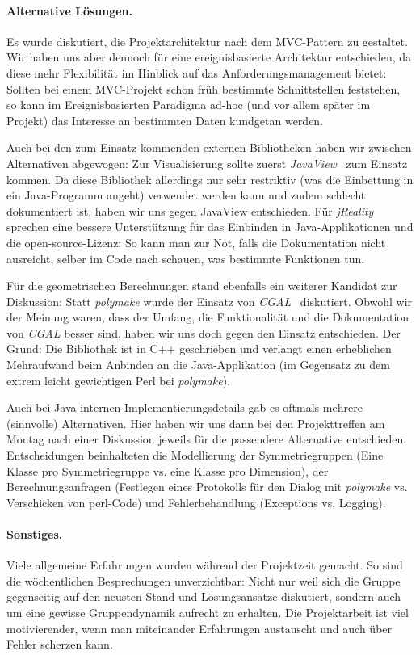 \paragraph{Alternative Lösungen.}
Es wurde diskutiert, die Projektarchitektur nach dem MVC-Pattern zu gestaltet. Wir haben uns aber dennoch für eine ereignisbasierte Architektur
entschieden, da diese mehr Flexibilität im Hinblick auf das Anforderungsmanagement bietet: Sollten bei einem MVC-Projekt schon früh bestimmte
Schnittstellen feststehen, so kann im Ereignisbasierten Paradigma ad-hoc (und vor allem später im Projekt) das Interesse an bestimmten Daten kundgetan werden.

\noindent Auch bei den zum Einsatz kommenden externen Bibliotheken haben wir zwischen Alternativen abgewogen: Zur Visualisierung
sollte zuerst \emph{JavaView}~\cite{javaview} zum Einsatz kommen. Da diese Bibliothek allerdings nur sehr restriktiv (was die Einbettung in ein Java-Programm angeht) verwendet werden kann und zudem schlecht dokumentiert ist, haben wir uns gegen JavaView entschieden.
Für \emph{jReality} sprechen eine bessere Unterstützung für das Einbinden in Java-Applikationen und die open-source-Lizenz: So kann man zur Not,
falls die Dokumentation nicht ausreicht, selber im Code nach schauen, was bestimmte Funktionen tun.

\noindent Für die geometrischen Berechnungen stand ebenfalls ein weiterer Kandidat zur Diskussion: Statt \emph{polymake} wurde der
Einsatz von \emph{CGAL}~\cite{cgal} diskutiert. Obwohl wir der Meinung waren, dass der Umfang, die Funktionalität und die Dokumentation von \emph{CGAL} besser sind, haben wir uns doch gegen den Einsatz entschieden. Der Grund: Die Bibliothek ist in C++ geschrieben und 
verlangt einen erheblichen Mehraufwand beim Anbinden an die Java-Applikation (im Gegensatz zu dem extrem leicht gewichtigen Perl bei \emph{polymake}).

\noindent Auch bei Java-internen Implementierungsdetails gab es oftmals mehrere (sinnvolle) Alternativen. Hier haben wir uns dann bei den Projekttreffen am Montag nach einer Diskussion jeweils für die passendere Alternative entschieden. Entscheidungen beinhalteten
die Modellierung der Symmetriegruppen (Eine Klasse pro Symmetriegruppe vs. eine Klasse pro Dimension), der Berechnungsanfragen
(Festlegen eines Protokolls für den Dialog mit \emph{polymake} vs. Verschicken von perl-Code) und
Fehlerbehandlung (Exceptions vs. Logging).

\paragraph{Sonstiges.}
Viele allgemeine Erfahrungen wurden während der Projektzeit gemacht. So sind die wöchentlichen Besprechungen unverzichtbar:
Nicht nur weil sich die Gruppe gegenseitig auf den neusten Stand und Lösungsansätze diskutiert, sondern auch um eine gewisse
Gruppendynamik aufrecht zu erhalten. Die Projektarbeit ist viel motivierender, wenn man miteinander Erfahrungen austauscht
und auch über Fehler scherzen kann.

